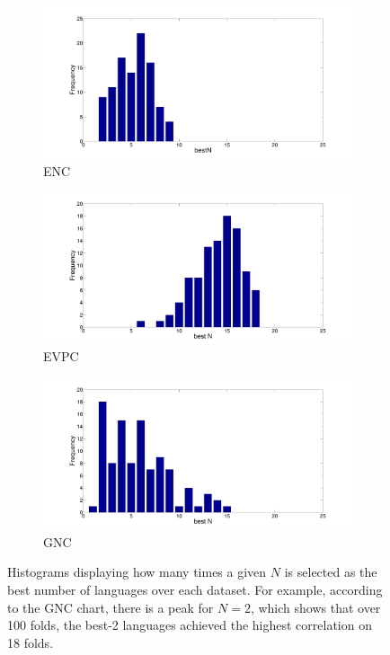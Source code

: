\documentclass[output=paper
,modfonts
,nonflat]{langsci/langscibook}
\begin{document}
\begin{figure}[t]
        \centering
        \begin{subfigure}[b]{0.47\textwidth}
                \includegraphics[width=\textwidth]{figures/bestN.pdf}
                \caption{ENC}
                \label{fig:Nnc}
        \end{subfigure}%
        \begin{subfigure}[b]{0.47\textwidth}
                \includegraphics[width=\textwidth]{figures/bestNvpc.pdf}
                \caption{EVPC}
                \label{fig:Nvpc}
        \end{subfigure}          
        \begin{subfigure}[b]{0.47\textwidth}
                \includegraphics[width=\textwidth]{figures/bestNgnc.pdf}
                \caption{GNC}
                \label{fig:Ngnc}
        \end{subfigure}
        \caption{Histograms displaying how many times a given $N$ is
          selected as the best number of languages over each
          dataset. For example, according to the GNC chart, there is a
          peak for $N=2$, which shows that over 100 folds, the best-2
          languages achieved the highest correlation on 18
          folds.}\label{fig:bestN}
\end{figure}
\end{document}
